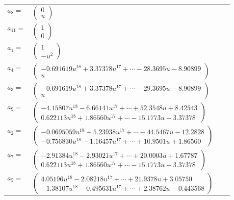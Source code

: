 \documentclass[1p]{elsarticle_modified}
\theoremstyle{definition}
\begin{document}
\begin{tabular}{m{7pt} m{180pt} m{7pt} m{180pt} }
\flushright $a_{8}=$&$\begin{pmatrix}0\\u\end{pmatrix}$ \\
\flushright $a_{11}=$&$\begin{pmatrix}1\\0\end{pmatrix}$ \\
\flushright $a_{1}=$&$\begin{pmatrix}1\\- u^2\end{pmatrix}$ \\
\flushright $a_{4}=$&$\begin{pmatrix}-0.691619 u^{18}+3.37378 u^{17}+\cdots-28.3695 u-8.90899\\u\end{pmatrix}$ \\
\flushright $a_{3}=$&$\begin{pmatrix}-0.691619 u^{18}+3.37378 u^{17}+\cdots-29.3695 u-8.90899\\u\end{pmatrix}$ \\
\flushright $a_{9}=$&$\begin{pmatrix}-4.15807 u^{18}-6.66141 u^{17}+\cdots+52.3548 u+8.42543\\0.622113 u^{18}+1.86560 u^{17}+\cdots-15.1773 u-3.37378\end{pmatrix}$ \\
\flushright $a_{2}=$&$\begin{pmatrix}-0.0695059 u^{18}+5.23938 u^{17}+\cdots-44.5467 u-12.2828\\-0.756830 u^{18}-1.16457 u^{17}+\cdots+10.9501 u+1.86560\end{pmatrix}$ \\
\flushright $a_{7}=$&$\begin{pmatrix}-2.91384 u^{18}-2.93021 u^{17}+\cdots+20.0003 u+1.67787\\0.622113 u^{18}+1.86560 u^{17}+\cdots-15.1773 u-3.37378\end{pmatrix}$ \\
\flushright $a_{5}=$&$\begin{pmatrix}4.05196 u^{18}-2.08218 u^{17}+\cdots+21.9378 u+3.05750\\-1.38107 u^{18}-0.495631 u^{17}+\cdots+2.38762 u-0.443568\end{pmatrix}$ \\

\end{tabular}
\end{document}
